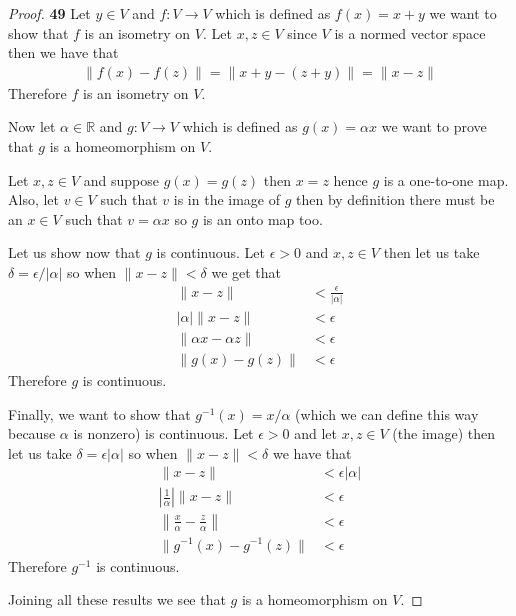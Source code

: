\documentclass[11pt]{article}
\newcommand{\R}{\mathbb{R}}
\theoremstyle{definition}
\begin{document}
    \begin{proof}{\textbf{49}}
        Let $y \in V$ and  $f:V\to V$ which is defined as $f(x) = x + y$
        we want to show that $f$ is an isometry on $V$. Let $x,z \in V$
        since $V$ is a normed vector space then we have that 
        \begin{align*}
            \|f(x) - f(z)\| = \|x+y-(z+y)\| = \|x-z\|
        \end{align*}
        Therefore $f$ is an isometry on $V$.

        Now let $\alpha \in \R$ and $g:V \to V$ which is defined as
        $g(x)=\alpha x$ we want to prove that $g$ is a homeomorphism on $V$.
        
        Let $x,z \in V$ and suppose $g(x)=g(z)$ then $x = z$ hence $g$ is
        a one-to-one map. Also, let $v \in V$ such that $v$ is in the image
        of $g$ then by definition there must be an $x \in V$ such that
        $v = \alpha x$ so $g$ is an onto map too.

        Let us show now that $g$ is continuous. Let $\epsilon > 0$ and
        $x,z \in V$ then let us take $\delta = \epsilon/|\alpha|$ so
        when $\|x-z\| < \delta$ we get that
        \begin{align*}
            \|x-z\| &< \frac{\epsilon}{|\alpha|}\\
            |\alpha|\|x-z\| &< \epsilon\\
            \|\alpha x-\alpha z\| &< \epsilon\\
            \|g(x) - g(z)\| &< \epsilon
        \end{align*}
        Therefore $g$ is continuous.

        Finally, we want to show that $g^{-1}(x) = x/\alpha$ (which we can define
        this way because $\alpha$ is nonzero) is continuous. Let $\epsilon > 0$
        and let $x,z \in V$ (the image) then let us take
        $\delta = \epsilon |\alpha|$ so when $\|x - z\| < \delta$
        we have that
        \begin{align*}
            \|x-z\| &< \epsilon|\alpha|\\
            \left|\frac{1}{\alpha}\right|\|x-z\| &< \epsilon\\
            \left\|\frac{x}{\alpha}-\frac{z}{\alpha}\right\| &< \epsilon\\
            \|g^{-1}(x) - g^{-1}(z)\| &< \epsilon
        \end{align*}
        Therefore $g^{-1}$ is continuous.

        Joining all these results we see that $g$ is a homeomorphism on $V$.
    \end{proof}
\end{document}

